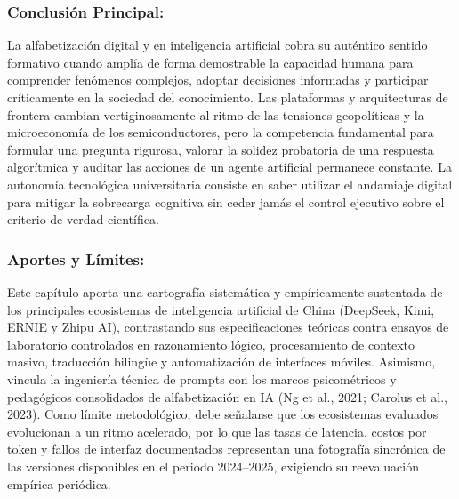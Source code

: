 \subsubsection*{Conclusión Principal:}
La alfabetización digital y en inteligencia artificial cobra su auténtico sentido formativo cuando amplía de forma demostrable la capacidad humana para comprender fenómenos complejos, adoptar decisiones informadas y participar críticamente en la sociedad del conocimiento. Las plataformas y arquitecturas de frontera cambian vertiginosamente al ritmo de las tensiones geopolíticas y la microeconomía de los semiconductores, pero la competencia fundamental para formular una pregunta rigurosa, valorar la solidez probatoria de una respuesta algorítmica y auditar las acciones de un agente artificial permanece constante. La autonomía tecnológica universitaria consiste en saber utilizar el andamiaje digital para mitigar la sobrecarga cognitiva sin ceder jamás el control ejecutivo sobre el criterio de verdad científica.

\subsubsection*{Aportes y Límites:}
Este capítulo aporta una cartografía sistemática y empíricamente sustentada de los principales ecosistemas de inteligencia artificial de China (DeepSeek, Kimi, ERNIE y Zhipu AI), contrastando sus especificaciones teóricas contra ensayos de laboratorio controlados en razonamiento lógico, procesamiento de contexto masivo, traducción bilingüe y automatización de interfaces móviles. Asimismo, vincula la ingeniería técnica de prompts con los marcos psicométricos y pedagógicos consolidados de alfabetización en IA (Ng et al., 2021; Carolus et al., 2023). Como límite metodológico, debe señalarse que los ecosistemas evaluados evolucionan a un ritmo acelerado, por lo que las tasas de latencia, costos por token y fallos de interfaz documentados representan una fotografía sincrónica de las versiones disponibles en el periodo 2024--2025, exigiendo su reevaluación empírica periódica.

